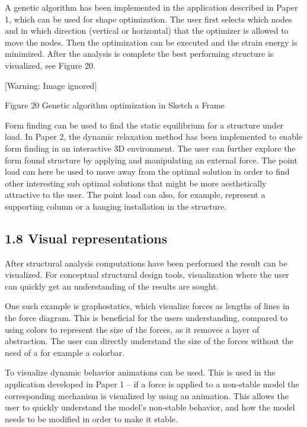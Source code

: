 A genetic algorithm has been implemented in the application described in Paper 1, which can be used for shape optimization. The user first selects which nodes and in which direction (vertical or horizontal) that the optimizer is allowed to move the nodes. Then the optimization can be executed and the strain energy is minimized. After the analysis is complete the best performing structure is visualized, see Figure 20. 

  [Warning: Image ignored] %
 

Figure 20 Genetic algorithm optimization in Sketch a Frame

Form finding can be used to find the static equilibrium for a structure under load. In Paper 2, the dynamic relaxation method has been implemented to enable form finding in an interactive 3D environment. The user can further explore the form found structure by applying and manipulating an external force. The point load can here be used to move away from the optimal solution in order to find other interesting sub optimal solutions that might be more aesthetically attractive to the user. The point load can also, for example, represent a supporting column or a hanging installation in the structure.



\subsection[1.8 Visual representations]{1.8 Visual representations}
After structural analysis computations have been performed the result can be visualized. For conceptual structural design tools, visualization where the user can quickly get an understanding of the results are sought. 



One such example is graphostatics, which visualize forces as lengths of lines in the force diagram. This is beneficial for the users understanding, compared to using colors to represent the size of the forces, as it removes a layer of abstraction. The user can directly understand the size of the forces without the need of a for example a colorbar.



To visualize dynamic behavior animations can be used. This is used in the application developed in Paper 1 – if a force is applied to a non-stable model the corresponding mechanism is visualized by using an animation. This allows the user to quickly understand the model’s non-stable behavior, and how the model needs to be modified in order to make it stable. 

